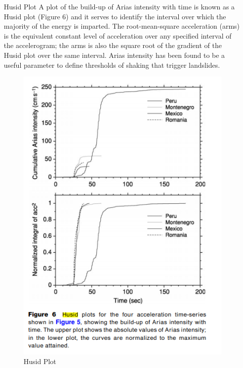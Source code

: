 \begin{itemize}
\item[Husid Plot] A plot of the build-up of Arias intensity with
time is known as a Husid plot (Figure 6) and it serves
to identify the interval over which the majority of
the energy is imparted. The root-mean-square acceleration (arms) is the equivalent constant level of
acceleration over any specified interval of the accelerogram; the arms is also the square root of the gradient of the Husid plot over the same interval. Arias
intensity has been found to be a useful parameter to
define thresholds of shaking that trigger landslides.
\begin{figure}[h!]
  \centering
  \includegraphics[scale=0.45]{images/I/husid.png}
  \caption{Husid Plot}\label{fig:husid}
\end{figure}
\end{itemize}


